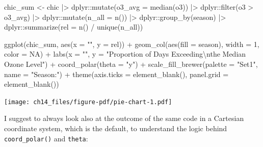 \documentclass[
  letterpaper,
  DIV=11,
  numbers=noendperiod]{scrreprt}
\newenvironment{Shaded}{\begin{snugshade}}{\end{snugshade}}
\newcommand{\AttributeTok}[1]{\textcolor[rgb]{0.40,0.45,0.13}{#1}}
\newcommand{\ConstantTok}[1]{\textcolor[rgb]{0.56,0.35,0.01}{#1}}
\newcommand{\DecValTok}[1]{\textcolor[rgb]{0.68,0.00,0.00}{#1}}
\newcommand{\FunctionTok}[1]{\textcolor[rgb]{0.28,0.35,0.67}{#1}}
\newcommand{\NormalTok}[1]{\textcolor[rgb]{0.00,0.23,0.31}{#1}}
\newcommand{\OtherTok}[1]{\textcolor[rgb]{0.00,0.23,0.31}{#1}}
\newcommand{\SpecialCharTok}[1]{\textcolor[rgb]{0.37,0.37,0.37}{#1}}
\newcommand{\StringTok}[1]{\textcolor[rgb]{0.13,0.47,0.30}{#1}}
\begin{document}
\begin{Shaded}
\begin{Highlighting}[]
\NormalTok{chic\_sum }\OtherTok{\textless{}{-}}
\NormalTok{  chic }\SpecialCharTok{|\textgreater{}}
\NormalTok{  dplyr}\SpecialCharTok{::}\FunctionTok{mutate}\NormalTok{(}\AttributeTok{o3\_avg =} \FunctionTok{median}\NormalTok{(o3)) }\SpecialCharTok{|\textgreater{}}
\NormalTok{  dplyr}\SpecialCharTok{::}\FunctionTok{filter}\NormalTok{(o3 }\SpecialCharTok{\textgreater{}}\NormalTok{ o3\_avg) }\SpecialCharTok{|\textgreater{}}
\NormalTok{  dplyr}\SpecialCharTok{::}\FunctionTok{mutate}\NormalTok{(}\AttributeTok{n\_all =} \FunctionTok{n}\NormalTok{()) }\SpecialCharTok{|\textgreater{}}
\NormalTok{  dplyr}\SpecialCharTok{::}\FunctionTok{group\_by}\NormalTok{(season) }\SpecialCharTok{|\textgreater{}}
\NormalTok{  dplyr}\SpecialCharTok{::}\FunctionTok{summarize}\NormalTok{(}\AttributeTok{rel =} \FunctionTok{n}\NormalTok{() }\SpecialCharTok{/} \FunctionTok{unique}\NormalTok{(n\_all))}

\FunctionTok{ggplot}\NormalTok{(chic\_sum, }\FunctionTok{aes}\NormalTok{(}\AttributeTok{x =} \StringTok{""}\NormalTok{, }\AttributeTok{y =}\NormalTok{ rel)) }\SpecialCharTok{+}
  \FunctionTok{geom\_col}\NormalTok{(}\FunctionTok{aes}\NormalTok{(}\AttributeTok{fill =}\NormalTok{ season), }\AttributeTok{width =} \DecValTok{1}\NormalTok{, }\AttributeTok{color =} \ConstantTok{NA}\NormalTok{) }\SpecialCharTok{+}
  \FunctionTok{labs}\NormalTok{(}\AttributeTok{x =} \StringTok{""}\NormalTok{, }\AttributeTok{y =} \StringTok{"Proportion of Days Exceeding}\SpecialCharTok{\textbackslash{}n}\StringTok{the Median Ozone Level"}\NormalTok{) }\SpecialCharTok{+}
  \FunctionTok{coord\_polar}\NormalTok{(}\AttributeTok{theta =} \StringTok{"y"}\NormalTok{) }\SpecialCharTok{+}
  \FunctionTok{scale\_fill\_brewer}\NormalTok{(}\AttributeTok{palette =} \StringTok{"Set1"}\NormalTok{, }\AttributeTok{name =} \StringTok{"Season:"}\NormalTok{) }\SpecialCharTok{+}
  \FunctionTok{theme}\NormalTok{(}\AttributeTok{axis.ticks =} \FunctionTok{element\_blank}\NormalTok{(),}
        \AttributeTok{panel.grid =} \FunctionTok{element\_blank}\NormalTok{())}
\end{Highlighting}
\end{Shaded}

\texttt{[image: ch14\_files/figure-pdf/pie-chart-1.pdf]}

I suggest to always look also at the outcome of the same code in a
Cartesian coordinate system, which is the default, to understand the
logic behind \texttt{coord\_polar()} and \texttt{theta}:
\end{document}
